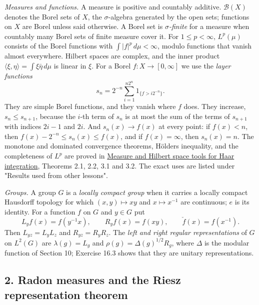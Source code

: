 \documentclass[
  english,
  11pt,
  a4paper,
]{article}
\begin{document}
\emph{Measures and functions.} A measure is positive and countably
additive. \(\mathcal B(X)\) denotes the Borel sets of \(X\), the
\(\sigma\)-algebra generated by the open sets; functions on \(X\) are
Borel unless said otherwise. A Borel set is \emph{\(\sigma\)-finite} for
a measure when countably many Borel sets of finite measure cover it. For
\(1\leq p<\infty\), \(L^p(\mu)\) consists of the Borel functions with
\(\int|f|^p\,d\mu<\infty\), modulo functions that vanish almost
everywhere. Hilbert spaces are complex, and the inner product
\(\langle\xi,\eta\rangle=\int\xi\bar\eta\,d\mu\) is linear in \(\xi\).
For a Borel \(f\colon X\to[0,\infty]\) we use the \emph{layer functions}
\[s_n=2^{-n}\sum_{i=1}^{n2^n}1_{\{f>i2^{-n}\}} .
\tag{1.1}\] They are simple Borel functions, and they vanish where \(f\)
does. They increase, \(s_n\leq s_{n+1}\), because the \(i\)-th term of
\(s_n\) is at most the sum of the terms of \(s_{n+1}\) with indices
\(2i-1\) and \(2i\). And \(s_n(x)\to f(x)\) at every point: if
\(f(x)<n\), then \(f(x)-2^{-n}\leq s_n(x)\leq f(x)\), and if
\(f(x)=\infty\), then \(s_n(x)=n\). The monotone and dominated
convergence theorems, Hölder\textquotesingle s inequality, and the
completeness of \(L^p\) are proved in
\hyperref[measure-and-hilbert-space-tools]{Measure and Hilbert space
tools for Haar integration}, Theorems 2.1, 2.2, 3.1 and 3.2. The exact
uses are listed under "Results used from other lessons".

\emph{Groups.} A group \(G\) is a \emph{locally compact group} when it
carries a locally compact Hausdorff topology for which
\((x,y)\mapsto xy\) and \(x\mapsto x^{-1}\) are continuous; \(e\) is its
identity. For a function \(f\) on \(G\) and \(y\in G\) put
\[L_yf(x)=f(y^{-1}x),\qquad R_yf(x)=f(xy),\qquad \check f(x)=f(x^{-1}).\]
Then \(L_{yz}=L_yL_z\) and \(R_{yz}=R_yR_z\). The \emph{left and right
regular representations} of \(G\) on \(L^2(G)\) are \(\lambda(g)=L_g\)
and \(\rho(g)=\Delta(g)^{1/2}R_g\), where \(\Delta\) is the modular
function of Section 10; Exercise 16.3 shows that they are unitary
representations.

\subsection[2. Radon measures and the Riesz representation
theorem]{\texorpdfstring{\protect\hypertarget{haar-measure-on-locally-compact-groups--oa-fnd-hm-01}{}{}2.
Radon measures and the Riesz representation
theorem}{2. Radon measures and the Riesz representation theorem}}\label{haar-measure-on-locally-compact-groups--OA-FND-HM-01}
\end{document}
